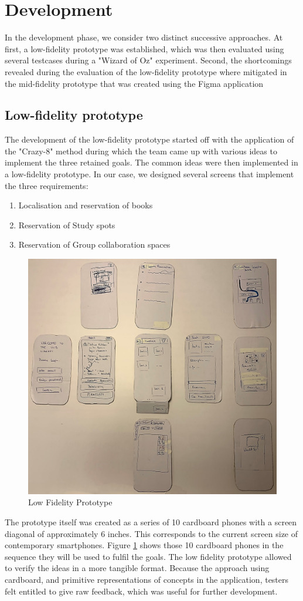 \documentclass[a4paper, 11pt]{article}
\begin{document}
\section{Development}
In the development phase, we consider two distinct successive approaches. At first, a low-fidelity prototype was established, which was then evaluated using several testcases during a "Wizard of Oz" experiment. Second, the shortcomings revealed during the evaluation of the low-fidelity prototype where mitigated in the mid-fidelity prototype that was created using the Figma\cite{figma} application\\

\subsection{Low-fidelity prototype}
The development of the low-fidelity prototype started off with the application of the "Crazy-8" method during which the team came up with various ideas to implement the three retained goals. The common ideas were then implemented in a low-fidelity prototype. In our case, we designed several screens that implement the three requirements: 
\begin{enumerate}
	\item Localisation and reservation of books
	\item Reservation of Study spots
	\item Reservation of Group collaboration spaces
\end{enumerate}
\begin{figure}[h]
	\centering
	\includegraphics[width=0.8\linewidth]{figures/lowFid2}
	\caption{Low Fidelity Prototype}
	\label{fig:lowfid}
\end{figure}
The prototype itself was created as a series of 10 cardboard phones with a screen diagonal of approximately 6 inches. This corresponds to the current screen size of contemporary smartphones. Figure \ref{fig:lowfid} shows those 10 cardboard phones in the sequence they will be used to fulfil the goals. The low fidelity prototype allowed to verify the ideas in a more tangible format. Because the approach using cardboard, and primitive representations of concepts in the application, testers felt entitled to give raw feedback, which was useful for further development.\\
\end{document}
